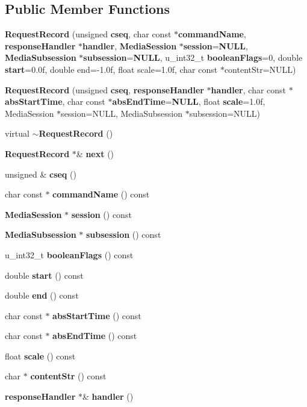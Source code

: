 \subsection*{Public Member Functions}
\begin{DoxyCompactItemize}
\item 
{\bf Request\+Record} (unsigned {\bf cseq}, char const $\ast${\bf command\+Name}, {\bf response\+Handler} $\ast${\bf handler}, {\bf Media\+Session} $\ast${\bf session}={\bf N\+U\+L\+L}, {\bf Media\+Subsession} $\ast${\bf subsession}={\bf N\+U\+L\+L}, u\+\_\+int32\+\_\+t {\bf boolean\+Flags}=0, double {\bf start}=0.\+0f, double end=-\/1.\+0f, float scale=1.\+0f, char const $\ast$content\+Str=\+N\+U\+L\+L)
\item 
{\bf Request\+Record} (unsigned {\bf cseq}, {\bf response\+Handler} $\ast${\bf handler}, char const $\ast${\bf abs\+Start\+Time}, char const $\ast${\bf abs\+End\+Time}={\bf N\+U\+L\+L}, float {\bf scale}=1.\+0f, Media\+Session $\ast$session=\+N\+U\+L\+L, Media\+Subsession $\ast$subsession=\+N\+U\+L\+L)
\item 
virtual {\bf $\sim$\+Request\+Record} ()
\item 
{\bf Request\+Record} $\ast$\& {\bf next} ()
\item 
unsigned \& {\bf cseq} ()
\item 
char const $\ast$ {\bf command\+Name} () const 
\item 
{\bf Media\+Session} $\ast$ {\bf session} () const 
\item 
{\bf Media\+Subsession} $\ast$ {\bf subsession} () const 
\item 
u\+\_\+int32\+\_\+t {\bf boolean\+Flags} () const 
\item 
double {\bf start} () const 
\item 
double {\bf end} () const 
\item 
char const $\ast$ {\bf abs\+Start\+Time} () const 
\item 
char const $\ast$ {\bf abs\+End\+Time} () const 
\item 
float {\bf scale} () const 
\item 
char $\ast$ {\bf content\+Str} () const 
\item 
{\bf response\+Handler} $\ast$\& {\bf handler} ()
\end{DoxyCompactItemize}
